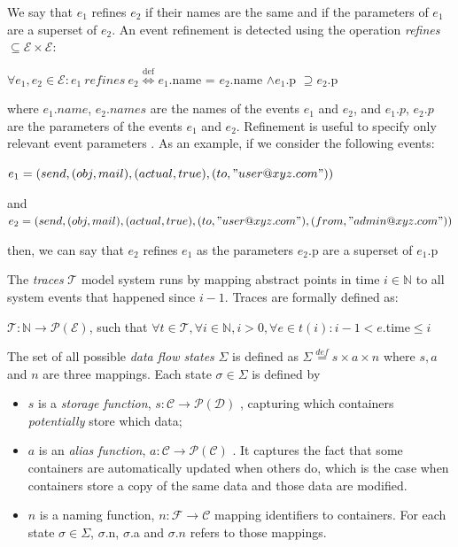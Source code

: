 We say that $e_1$ refines $e_2$ if their names are the same and if the parameters of $e_1$ are a superset of $e_2$.
An event refinement is detected using the operation \emph{refines} $\subseteq \mathcal{E} \times \mathcal{E}$:

\begin{center}
    $\forall e_1, e_2 \in \mathcal{E}: e_1~refines~e_2 \stackrel{\text {def}}{\Longleftrightarrow} e_{1}$.name = $e_{2}$.name $\land e_{1}.$p $\supseteq e_{2}.$p    
\end{center}
where $e_{1}.name$, $e_{2}.names$ are the names of the events $e_1$ and $e_2$, and $e_{1}.p$, $e_{2}.p$ are the parameters of the events $e_1$ and $e_2$. Refinement is useful to specify only relevant event parameters .
As an example, if we consider the following events:
\begin{center}
$e_1 = (send, (obj, mail), (actual, true), (to, "user@xyz.com"))$

and $e_2 = (send, (obj, mail), (actual, true), (to, "user@xyz.com"), (from,"admin@xyz.com" ))$
\end{center}
then, we can say that $e_2$ refines $e_1$ as the parameters $e_2$.p are a superset of $e_1$.p

The \emph{traces} $\mathcal{T}$ model system runs by mapping abstract points in time $i \in \mathbb{N}$ to all system events that happened since $i-1$. Traces are formally defined as: 
\begin{center}
$\mathcal{T}: \mathbb{N} \to \mathcal{P(\mathcal{E})}$, such that $ \forall t \in \mathcal{T}, \forall i \in \mathbb{N}, i > 0, \forall e \in t(i) : i-1 < e.$time$ \leq i $ 
\end{center}
The set of all possible \emph{data flow states} $\Sigma$ is defined as $\Sigma \overset{def}{=} s \times a \times n$ where $s, a $ and $n$ are three mappings. Each state $\sigma \in \Sigma$ is defined by 
\begin{itemize}
    \item $s$ is a \emph{storage function}, $s: \mathcal{C} \to \mathcal{P}(\mathcal{D})$ , capturing which containers \emph{potentially} store which data;
    \item $a$ is an \emph{alias function}, $a:  \mathcal{C} \to \mathcal{P}(\mathcal{C})$ . It captures the fact that some containers are automatically updated when others do, which is the case when containers store a copy of the same data and those data are modified. 
    \item $n$ is a naming function, $n: \mathcal{F} \to \mathcal{C}$ mapping identifiers to containers. For each state $\sigma \in \Sigma$, $\sigma$.n, $\sigma$.a and $\sigma.n$ refers to those mappings.
\end{itemize}


